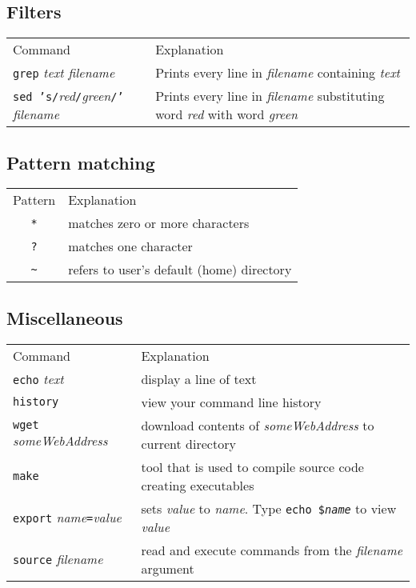 \documentclass{article}
\begin{document}
\subsection{Filters}
\begin{tabular}{ll}
  Command & Explanation \\
  \hhline{==}
  \texttt{grep} \textit{text filename} & Prints every line in \textit{filename} containing \textit{text} \\
  \texttt{sed 's/}\textit{red}\texttt{/}\textit{green}\texttt{/'} \textit{filename} & Prints every line in \textit{filename} 
     substituting word \textit{red} with word \textit{green} 
\end{tabular}

\subsection{Pattern matching}
\begin{tabular}{cl}
  Pattern & Explanation \\
  \hhline{==}
  \texttt{*} & matches zero or more characters \\
  \texttt{?} & matches one character \\
  \texttt{\textasciitilde} & refers to user's default (home) directory
\end{tabular}

\subsection{Miscellaneous}
\begin{tabular}{ll}
  Command & Explanation \\
  \hhline{==}
  \texttt{echo} \textit{text} & display a line of text \\
  \texttt{history} & view your command line history \\
  \texttt{wget} \textit{someWebAddress} & download contents of \textit{someWebAddress} to current directory\\
  \texttt{make} & tool that is used to compile source code creating executables\\
  \texttt{export} \textit{name}\texttt{=}\textit{value} & sets \textit{value} to \textit{name}. Type \texttt{echo \$\textit{name}} to view \textit{value}\\
  \texttt{source} \textit{filename} & read and execute commands from the \textit{filename} argument \\
\end{tabular}  
\end{document}
